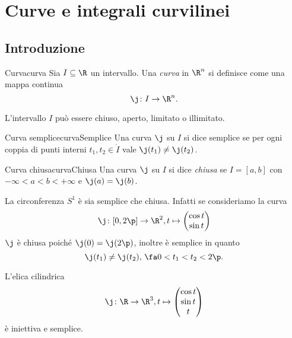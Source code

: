 %
%
\chapter{Curve e integrali curvilinei}
\section{Introduzione}

\begin{defn}{Curva}{curva}
	Sia \(I\subseteq\R\) un intervallo.
	Una \emph{curva} in \(\R^n\) si definisce come una mappa continua
	\[
		\j\colon I\to \R^n.
	\]
\end{defn}

\begin{oss}
	L'intervallo \(I\) può essere chiuso, aperto, limitato o illimitato.
\end{oss}

\begin{defn}{Curva semplice}{curvaSemplice}
	Una curva \(\j\) su \(I\) si dice semplice se per ogni coppia di punti interni \(t_1,t_2\in \mathring{I}\) vale \(\j(t_1)\neq\j(t_2)\).
\end{defn}

\begin{defn}{Curva chiusa}{curvaChiusa}
	Una curva \(\j\) su \(I\) si dice \emph{chiusa} se \(I=[a,b]\) con \(-\infty<a<b<+\infty\) e \(\j(a)=\j(b)\).
\end{defn}

\begin{ese}
	La circonferenza \(S^1\) è sia semplice che chiusa.
	Infatti se consideriamo la curva
	\[
		\j\colon [0,2\p] \to \R^2, t \mapsto 	\begin{pmatrix}
			\cos t \\
			\sin t
		\end{pmatrix}
	\]
	\(\j\) è chiusa poiché \(\j(0)=\j(2\p)\), inoltre è semplice in quanto
	\[
		\j(t_1)\neq \j(t_2),\,\fa 0<t_1<t_2<2\p.
	\]
\end{ese}

\begin{ese}
	L'elica cilindrica
	\[
		\j\colon \R \to \R^3, t \mapsto \begin{pmatrix}
			\cos t \\
			\sin t \\
			t
		\end{pmatrix}
	\]
	è iniettiva e semplice.
\end{ese}

